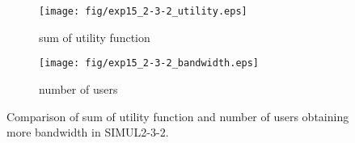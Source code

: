 \begin{figure}
	\begin{center}
		\begin{subfigure}[b]{0.8\textwidth}
			\centering
			\texttt{[image: fig/exp15\_2-3-2\_utility.eps]}
			\caption{sum of utility function}
			\label{figure:simul2_3_2_u_a}
		\end{subfigure}
		\begin{subfigure}[b]{0.8\textwidth}
			\centering
			\texttt{[image: fig/exp15\_2-3-2\_bandwidth.eps]}
			\caption{number of users}
			\label{figure:simul2_3_2_u_b}
		\end{subfigure}
		\caption{Comparison of sum of utility function and number of users obtaining more bandwidth in SIMUL2-3-2.}
		\label{figure:simul2_3_2_u}
	\end{center}
\end{figure}

\clearpage

